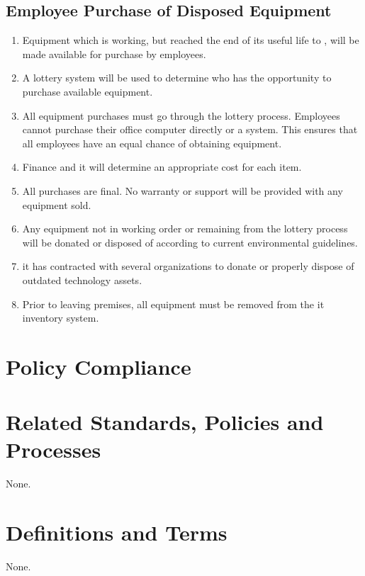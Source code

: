 \subsection{Employee Purchase of Disposed Equipment}\label{SS:TEDP:Po:EPDE}
\begin{enumerate}
\item
Equipment which is working, but reached the end of its useful life to \CompanyName{}, will be made available for purchase by employees.
\item
A lottery system will be used to determine who has the opportunity to purchase available equipment.
\item
All equipment purchases must go through the lottery process.  
Employees cannot purchase their office computer directly or  a system.  
This ensures that all employees have an equal chance of obtaining equipment.
\item
Finance and \gls{it} will determine an appropriate cost for each item.  
\item
All purchases are final.  
No warranty or support will be provided with any equipment sold.  
\item
Any equipment not in working order or remaining from the lottery process will be donated or disposed of according to current environmental guidelines.  
\item
\gls{it} has contracted with several organizations to donate or properly dispose of outdated technology assets.   
\item
Prior to leaving \CompanyName{} premises, all equipment must be removed from the \gls{it} inventory system.  
\end{enumerate}
\section{Policy Compliance}
\CommonPolicyCompliance
\section{Related Standards, Policies\oxford{} and Processes}
None.
\section{Definitions and Terms}
None.
\CommonRevisionHistory